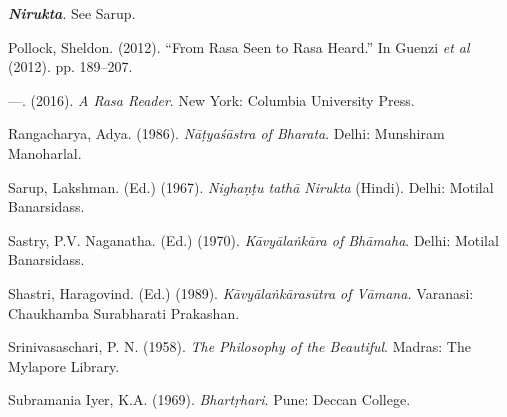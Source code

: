 \begin{thebibliography}{99}
  \textit{\textbf{Nirukta}}. See Sarup.

  Pollock, Sheldon. (2012). “From Rasa Seen to Rasa Heard.” In Guenzi \textit{et al} (2012). pp. 189–207.

  —. (2016). \textit{A Rasa Reader}. New York: Columbia University Press.

  Rangacharya, Adya. (1986). \textit{Nāṭyaśāstra of Bharata}. Delhi: Munshiram Manoharlal.

  Sarup, Lakshman. (Ed.) (1967). \textit{Nighaṇṭu tathā Nirukta} (Hindi). Delhi: Motilal Banarsidass.

  Sastry, P.V. Naganatha. (Ed.) (1970).\textit{ Kāvyālaṅkāra of Bhāmaha}. Delhi: Motilal Banarsidass.

  Shastri, Haragovind. (Ed.) (1989). \textit{Kāvyālaṅkārasūtra of Vāmana.} Varanasi: Chaukhamba Surabharati Prakashan.

  Srinivasaschari, P. N. (1958). \textit{The Philosophy of the Beautiful}. Madras: The Mylapore Library.

  Subramania Iyer, K.A. (1969). \textit{Bhartṛhari}. Pune: Deccan College.

 \end{thebibliography}

